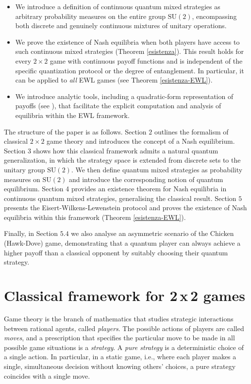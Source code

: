 \documentclass[11pt,a4paper,twoside]{article}
\newcommand{\SU}{\mathrm{SU}}
\begin{document}
\begin{itemize}
\item We introduce a definition of continuous quantum mixed strategies as arbitrary probability measures on the entire group $\SU(2)$, encompassing both discrete and genuinely continuous mixtures of unitary operations.
\item We prove the existence of Nash equilibria when both players have access to such continuous mixed strategies (Theorem \ref{esistenza}). This result holds for every $2\times 2$ game with continuous payoff functions and is independent of the specific quantization protocol or the degree of entanglement. In particular, it can be applied to \emph{all} EWL games (see Theorem \ref{esistenza-EWL}).
\item We introduce analytic tools, including a quadratic-form representation of payoffs (see \cite{Jiangfeng_Du_2003}), that facilitate the explicit computation and analysis of equilibria within the EWL framework.
\end{itemize} 

The structure of the paper is as follows. Section $2$ outlines the formalism of classical \(2 \times 2\) game theory and introduces the concept of a Nash equilibrium. Section $3$ shows how this classical framework admits a natural quantum generalization, in which the strategy space is extended from discrete sets to the unitary group $\mathrm{SU(2)}$. We then define quantum mixed strategies as probability measures on $\mathrm{SU(2)}$ and introduce the corresponding notion of quantum equilibrium. Section 4 provides an existence theorem for Nash equilibria in continuous quantum mixed strategies, generalising the classical result. Section $5$ presents the Eisert-Wilkens-Lewenstein protocol \cite{eisert_quantum} and proves the existence of Nash equilibria within this framework (Theorem \ref{esistenza-EWL}).

Finally, in Section $5.4$ we also analyse an asymmetric scenario of the Chicken (Hawk-Dove) game, demonstrating that a quantum player can always achieve a higher payoff than a classical opponent by suitably choosing their quantum strategy.



\section{Classical framework for 2\,x\,2 games}
 Game theory is the branch of mathematics that studies strategic interactions between rational agents, called \emph{players}. The possible actions of players are called \emph{moves}, and a prescription that specifies the particular move to be made in all possible game situations is a \emph{strategy}. A \emph{pure strategy} is a deterministic choice of a single action. In particular, in a static game, i.e., where each player makes a single, simultaneous decision without knowing others' choices, a pure strategy coincides with a single move.
\end{document}
